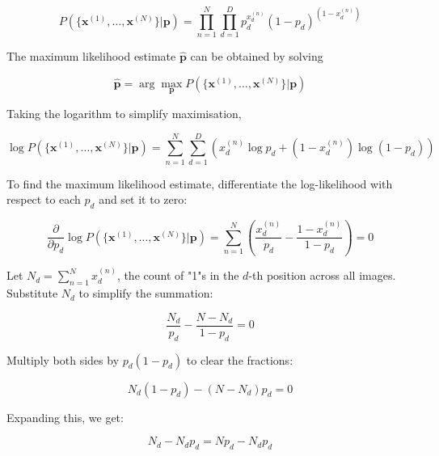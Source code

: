 \documentclass{article}
\begin{document}
\begin{enumerate}
    \begin{equation}
    P(\{\mathbf{x}^{(1)}, \ldots, \mathbf{x}^{(N)}\} | \mathbf{p}) = \prod_{n=1}^N \prod_{d=1}^D p_d^{x_d^{(n)}} (1 - p_d)^{(1 - x_d^{(n)})}
    \end{equation}
    
    The maximum likelihood estimate \(\hat{\mathbf{p}}\) can be obtained by solving
    
    \begin{equation}
    \hat{\mathbf{p}} = \arg \max_{\mathbf{p}} P(\{\mathbf{x}^{(1)}, \ldots, \mathbf{x}^{(N)}\} | \mathbf{p})
    \end{equation}
    
    Taking the logarithm to simplify maximisation,
    
    \begin{equation}
    \log P(\{\mathbf{x}^{(1)}, \ldots, \mathbf{x}^{(N)}\} | \mathbf{p}) = \sum_{n=1}^N \sum_{d=1}^D \left( x_d^{(n)} \log p_d + (1 - x_d^{(n)}) \log (1 - p_d) \right)
    \end{equation}

    To find the maximum likelihood estimate, differentiate the log-likelihood with respect to each \(p_d\) and set it to zero:
    
    \begin{equation}
    \frac{\partial}{\partial p_d} \log P(\{\mathbf{x}^{(1)}, \ldots, \mathbf{x}^{(N)}\} | \mathbf{p}) = \sum_{n=1}^N \left( \frac{x_d^{(n)}}{p_d} - \frac{1 - x_d^{(n)}}{1 - p_d} \right) = 0
    \end{equation}
    
    Let \(N_d = \sum_{n=1}^N x_d^{(n)}\), the count of "1"s in the \(d\)-th position across all images. Substitute \(N_d\) to simplify the summation:

    \begin{equation}
    \frac{N_d}{p_d} - \frac{N - N_d}{1 - p_d} = 0
    \end{equation}
    
    Multiply both sides by \(p_d (1 - p_d)\) to clear the fractions:
    
    \begin{equation}
    N_d (1 - p_d) - (N - N_d) p_d = 0
    \end{equation}
    
    Expanding this, we get:
    
    \begin{equation}
    N_d - N_d p_d = N p_d - N_d p_d
    \end{equation}
    

\end{enumerate}
\end{document}

